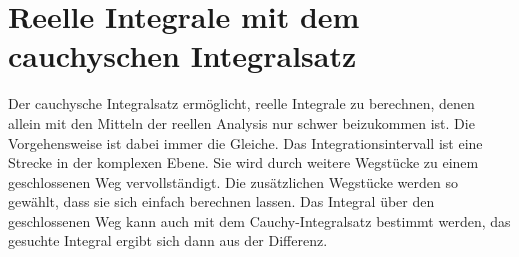 %
%
%
\section{Reelle Integrale mit dem cauchyschen Integralsatz
\label{buch:integration:section:residuen}}
Der cauchysche Integralsatz ermöglicht, reelle Integrale zu berechnen,
denen allein mit den Mitteln der reellen Analysis nur schwer beizukommen
ist.
Die Vorgehensweise ist dabei immer die Gleiche.
Das Integrationsintervall ist eine Strecke in der komplexen Ebene.
Sie wird durch weitere Wegstücke zu einem geschlossenen Weg
vervollständigt.
Die zusätzlichen Wegstücke werden so gewählt, dass sie sich
einfach berechnen lassen.
Das Integral über den geschlossenen Weg kann auch mit dem Cauchy-Integralsatz
bestimmt werden, das gesuchte Integral ergibt sich dann aus der Differenz.





